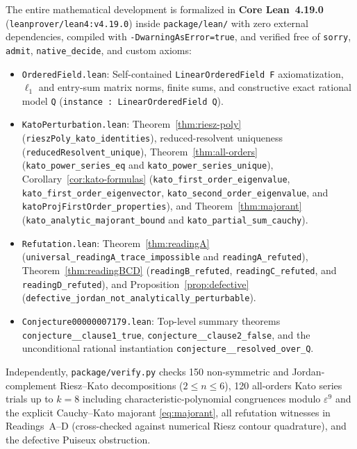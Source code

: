 \documentclass[11pt,a4paper]{article}
\theoremstyle{definition}
\begin{document}
\begin{sloppypar}
The entire mathematical development is formalized in \textbf{Core Lean~4.19.0}
(\texttt{leanprover/\allowbreak lean4:\allowbreak v4.19.0}) inside \texttt{package/lean/}
with zero external dependencies, compiled with \texttt{-DwarningAsError=true}, and
verified free of \texttt{sorry}, \texttt{admit}, \texttt{native\_decide}, and custom
axioms:
\begin{itemize}
  \item \texttt{OrderedField.lean}: Self-contained \texttt{LinearOrderedField F}
  axiomatization, $\ell_1$ and entry-sum matrix norms, finite sums, and constructive
  exact rational model \texttt{Q} (\texttt{instance : LinearOrderedField Q}).
  \item \texttt{KatoPerturbation.lean}: Theorem~\ref{thm:riesz-poly}
  (\texttt{rieszPoly\_\allowbreak kato\_\allowbreak identities}), reduced-resolvent
  uniqueness (\texttt{reducedResolvent\_\allowbreak unique}),
  Theorem~\ref{thm:all-orders} (\texttt{kato\_\allowbreak power\_\allowbreak series\_eq}
  and \texttt{kato\_\allowbreak power\_\allowbreak series\_\allowbreak unique}),
  Corollary~\ref{cor:kato-formulas} (\texttt{kato\_\allowbreak first\_\allowbreak order\_\allowbreak eigenvalue},
  \texttt{kato\_\allowbreak first\_\allowbreak order\_\allowbreak eigenvector},
  \texttt{kato\_\allowbreak second\_\allowbreak order\_\allowbreak eigenvalue}, and
  \texttt{katoProjFirstOrder\_\allowbreak properties}), and Theorem~\ref{thm:majorant}
  (\texttt{kato\_\allowbreak analytic\_\allowbreak majorant\_\allowbreak bound} and
  \texttt{kato\_\allowbreak partial\_\allowbreak sum\_\allowbreak cauchy}).
  \item \texttt{Refutation.lean}: Theorem~\ref{thm:readingA}
  (\texttt{universal\_\allowbreak readingA\_\allowbreak trace\_\allowbreak impossible}
  and \texttt{readingA\_\allowbreak refuted}), Theorem~\ref{thm:readingBCD}
  (\texttt{readingB\_\allowbreak refuted}, \texttt{readingC\_\allowbreak refuted}, and
  \texttt{readingD\_\allowbreak refuted}), and Proposition~\ref{prop:defective}
  (\texttt{defective\_\allowbreak jordan\_\allowbreak not\_\allowbreak analytically\_\allowbreak perturbable}).
  \item \texttt{Conjecture00000007179.lean}: Top-level summary theorems
  \texttt{conjecture\_\_\allowbreak clause1\_true},
  \texttt{conjecture\_\_\allowbreak clause2\_false}, and the
  unconditional rational instantiation
  \texttt{conjecture\_\_\allowbreak resolved\_\allowbreak over\_Q}.
\end{itemize}
\end{sloppypar}
Independently, \texttt{package/verify.py} checks 150 non-symmetric and
Jordan-complement Riesz--Kato decompositions ($2 \le n \le 6$), 120 all-orders Kato
series trials up to $k = 8$ including characteristic-polynomial congruences modulo
$\varepsilon^9$ and the explicit Cauchy--Kato majorant \eqref{eq:majorant}, all
refutation witnesses in Readings~A--D (cross-checked against numerical Riesz contour
quadrature), and the defective Puiseux obstruction.
\end{document}
